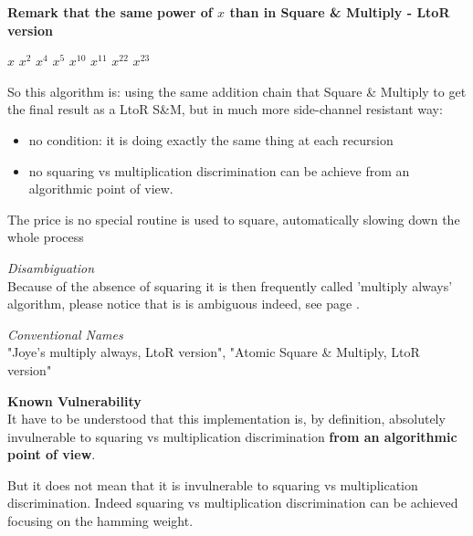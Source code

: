 \begin{itemize}
			\textbf{Remark that the same power of $x$ than in Square \& Multiply - LtoR version}
			\begin{center}
			$x$ $x^2$ $x^4$ $x^5$ $x^{10}$ $x^{11}$ $x^{22}$ $x^{23}$
			\end{center}


			So this algorithm is: using the same addition chain that Square \& Multiply to get 
			the final result as a LtoR S\&M, but in much more side-channel resistant way: 
			\begin{itemize}
				\item no condition: it is doing exactly the same thing at each recursion
				\item no squaring vs multiplication discrimination can be achieve from an 
				algorithmic point of view. 			
			\end{itemize}
            The price is no special routine is used to square, automatically slowing down the whole process 
            		
				
		\textit{Disambiguation}\\
			Because of the absence of squaring it is then frequently called
			'multiply always'  algorithm, please notice that is is ambiguous indeed, 
			see page \pageref{Square_Multiply_Always}.

		\textit{Conventional Names}\\
			"Joye's multiply always, LtoR version",  
			"Atomic Square \& Multiply, LtoR version"

		\textbf{Known Vulnerability}\\
		It have to be understood that this implementation is, by definition, absolutely 
		invulnerable to squaring vs multiplication discrimination 	
		\textbf{from an algorithmic point of view}.

		But it does not mean that it is invulnerable to squaring vs multiplication discrimination.
Indeed squaring vs multiplication discrimination can be achieved focusing on the hamming weight.

			
\end{itemize}					